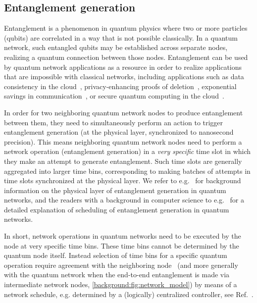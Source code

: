 \subsection{Entanglement generation}
\label{background:sec:entanglement}
Entanglement is a phenomenon in quantum physics where two or more particles (qubits) are correlated in a way that is not possible classically. In a quantum network, such entangled qubits may be established across separate nodes, realizing a quantum connection between those nodes. Entanglement can be used by quantum network applications as a resource in order to realize applications~\cite{wehner_2018_stages} that are impossible with classical networks, including applications such as data consistency in the cloud~\cite{benor_2005_byzantine}, privacy-enhancing proofs of deletion~\cite{poremba_quantum_2022}, exponential savings in communication~\cite{guerin_exponential_2016}, or secure quantum computing in the cloud~\cite{broadbent_2009_ubqc,childs_2005_secure_qc}.

In order for two neighboring quantum network nodes to produce entanglement between them, they need to simultaneously perform an action to trigger entanglement generation (at the physical layer, synchronized to nanosecond precision).
This means neighboring quantum network nodes need to perform a network operation (entanglement generation) in a \emph{very specific} time slot in which they make an attempt to generate entanglement.
Such time slots are generally aggregated into larger time bins, corresponding to making batches of attempts in time slots synchronized at the physical layer.
We refer to e.g.~\cite{pompili_2022_experimental} for background information on the physical layer of entanglement generation in quantum networks, and the readers with a background in computer science to e.g.~\cite{dahlberg_2019_egp} for a detailed explanation of scheduling of entanglement generation in quantum networks.

In short, network operations in quantum networks need to be executed by the node at very specific time bins.
These time bins cannot be determined by the quantum node itself.
Instead selection of time bins for a specific quantum operation require agreement with the neighboring node~\cite{dahlberg_2019_egp} (and more generally with the quantum network when the end-to-end entanglement is made via intermediate network nodes, \cref{background:fig:network_model}) by means of a network schedule, e.g. determined by a (logically) centralized controller, see Ref.~\cite{skrzypczyk_2021_arch}.

